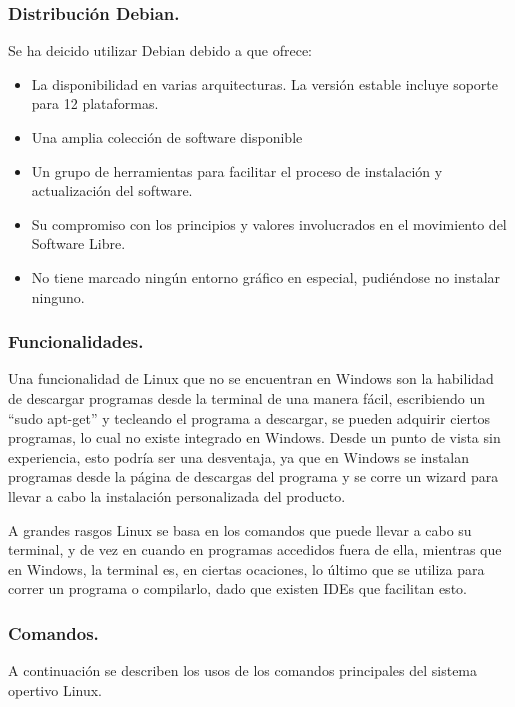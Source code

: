 \documentclass[12pt]{article}
\begin{document}
\subsubsection{Distribución Debian.}
Se ha deicido utilizar Debian debido a que ofrece: 
\begin{itemize}
    \item {La disponibilidad en varias arquitecturas. La versión estable incluye soporte para 12 plataformas.}
    \item {Una amplia colección de software disponible}
    \item{Un grupo de herramientas para facilitar el proceso de instalación y actualización del software.}
    \item{Su compromiso con los principios y valores involucrados en el movimiento del Software Libre.}
    \item{No tiene marcado ningún entorno gráfico en especial, pudiéndose no instalar ninguno.}
\end{itemize}

\subsubsection{Funcionalidades.}
Una funcionalidad de Linux que no se encuentran en Windows son la habilidad de descargar programas desde la terminal de una manera fácil, escribiendo un “sudo apt-get” y tecleando el programa a descargar, se pueden adquirir ciertos programas, lo cual no existe integrado en Windows. Desde un punto de vista sin experiencia, esto podría ser una desventaja, ya que en Windows se instalan programas desde la página de descargas del programa y se corre un wizard para llevar a cabo la instalación personalizada del producto. 

A grandes rasgos Linux se basa en los comandos que puede llevar a cabo su terminal, y de vez en cuando en programas accedidos fuera de ella, mientras que en Windows, la terminal es, en ciertas ocaciones, lo último que se utiliza para correr un programa o compilarlo, dado que existen IDEs que facilitan esto.


\newpage
\subsubsection{Comandos.}
A continuación se describen los usos de los comandos principales del sistema opertivo Linux.

    \\
 
\end{document}
